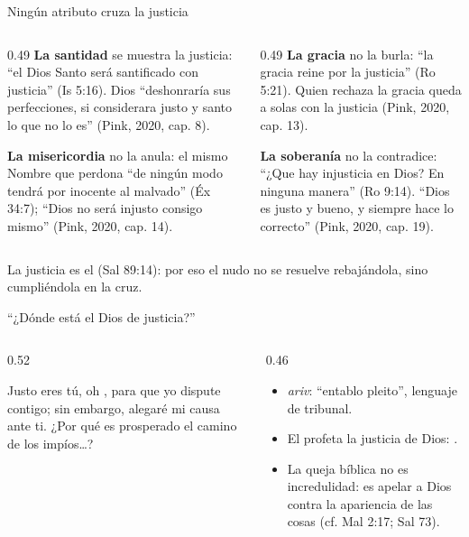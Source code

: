 \begin{frame}{Ningún atributo cruza la justicia}
\begin{columns}[t,onlytextwidth]
\begin{column}{0.49\textwidth}\small
\textbf{\color{azul}La santidad} se muestra  la justicia: ``el Dios Santo será santificado con justicia'' (Is 5:16). Dios ``deshonraría sus perfecciones, si considerara justo y santo lo que no lo es'' (Pink, 2020, cap. 8).\par\medskip
\textbf{\color{azul}La misericordia} no la anula: el mismo Nombre que perdona ``de ningún modo tendrá por inocente al malvado'' (Éx 34:7); ``Dios no será injusto consigo mismo'' (Pink, 2020, cap. 14).
\end{column}
\begin{column}{0.49\textwidth}\small
\textbf{\color{azul}La gracia} no la burla: ``la gracia reine por la justicia'' (Ro 5:21). Quien rechaza la gracia queda a solas con la justicia (Pink, 2020, cap. 13).\par\medskip
\textbf{\color{azul}La soberanía} no la contradice: ``¿Que hay injusticia en Dios? En ninguna manera'' (Ro 9:14). ``Dios es justo y bueno, y siempre hace lo correcto'' (Pink, 2020, cap. 19).
\end{column}
\end{columns}\par\medskip
\small La justicia es el  (Sal 89:14): por eso el nudo no se resuelve rebajándola, sino cumpliéndola en la cruz.
\end{frame}


\begin{frame}{``¿Dónde está el Dios de justicia?''}
\begin{columns}[c,onlytextwidth]
\begin{column}{0.52\textwidth}
\begin{cita}Justo eres tú, oh \SENOR, para que yo dispute contigo; sin embargo, alegaré mi causa ante ti. ¿Por qué es prosperado el camino de los impíos\ldots?\end{cita}
\begin{center}\small{}\end{center}
\end{column}
\begin{column}{0.46\textwidth}\small
\begin{itemize}
\item {} \emph{ariv}: ``entablo pleito'', lenguaje de tribunal.
\item El profeta  la justicia de Dios: .
\item La queja bíblica no es incredulidad: es apelar a Dios contra la apariencia de las cosas (cf. Mal 2:17; Sal 73).
\end{itemize}
\end{column}
\end{columns}
\end{frame}


